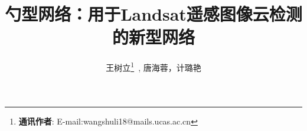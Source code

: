 \title{勺型网络：用于Landsat遥感图像云检测的新型网络}
\author[]{王树立\thanks{\noindent \textbf{通讯作者}: E-mail:wangshuli18@mails.ucas.ac.cn}\ , 唐海蓉，计璐艳}
\renewcommand\Authands{\, }
\pagestyle{empty} %